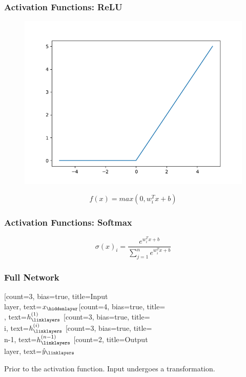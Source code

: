 \documentclass{beamer}
\begin{document}
\begin{frame}[fragile]
\frametitle{Activation Functions: ReLU}
\begin{figure}
		\includegraphics[scale=.4]{Images/Output/relu.png}
\end{figure}
		\begin{equation}
			f(x) = max(0,w_{i}^{T}x+b)
		\end{equation}
\end{frame}

\begin{frame}[fragile]
\frametitle{Activation Functions: Softmax}
		\begin{equation}
			\sigma(x)_i = \frac{e^{w_{i}^{T}x+b}}{\sum_{j=1}^{n}e^{w_{i}^{T}x+b}}
		\end{equation}
\end{frame}


\begin{frame}[fragile]
\frametitle{Full Network}
	\begin{neuralnetwork}[height=4, layerspacing=23mm]
		\newcommand{\x}[2]{$x_#2$}
		\newcommand{\y}[2]{$\hat{y}_#2$}
		\newcommand{\hfirst}[2]{\small $h^{(1)}_#2$}
		\newcommand{\hi}[2]{\small $h^{(i)}_#2$}
		\newcommand{\hsecond}[2]{\scriptsize $h^{(n-1)}_#2$}
		[count=3, bias=true, title=Input\\layer, text=\x]
		\hiddenlayer[count=4, bias=true, title=\\, text=\hfirst] \linklayers
		\hiddenlayer[count=3, bias=true, title=\\i, text=\hi] \linklayers
		\hiddenlayer[count=3, bias=true, title=\\n-1, text=\hsecond] \linklayers
		\outputlayer[count=2, title=Output\\layer, text=\y] \linklayers
	    \end{neuralnetwork}
	\begin{center}
	    Prior to the activation function. Input undergoes a transformation.
	\end{center}
\end{frame}
\end{document}
